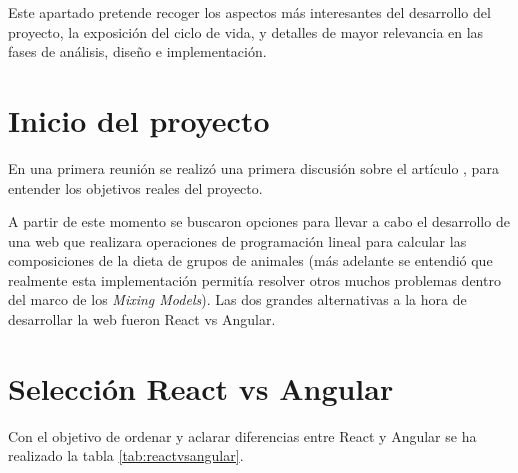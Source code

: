 
Este apartado pretende recoger los aspectos más interesantes del desarrollo del proyecto, la exposición del ciclo de vida, y detalles de mayor relevancia en las fases de análisis, diseño e implementación.

\section{Inicio del proyecto}


En una primera reunión se realizó una primera  discusión sobre el artículo \cite{problemn-alkanes2007}, para entender los objetivos reales del proyecto. 

A partir de este momento se buscaron opciones para llevar a cabo el desarrollo de una web que realizara operaciones de programación lineal para calcular las composiciones de la dieta de grupos de animales (más adelante se entendió que realmente  esta implementación  permitía resolver otros muchos problemas dentro del marco de los \emph{Mixing Models}). Las dos grandes alternativas a la hora de desarrollar la web fueron React vs Angular.

\section{Selección React vs Angular}

Con el objetivo de ordenar y aclarar diferencias entre React y Angular se ha realizado la tabla \ref{tab:reactvsangular}.

